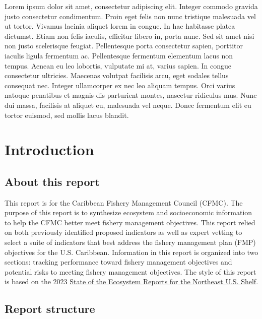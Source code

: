 \documentclass[
  letterpaper,
  oneside,
  open=any]{scrbook}
\begin{document}
Lorem ipsum dolor sit amet, consectetur adipiscing elit. Integer commodo
gravida justo consectetur condimentum. Proin eget felis non nunc
tristique malesuada vel ut tortor. Vivamus lacinia aliquet lorem in
congue. In hac habitasse platea dictumst. Etiam non felis iaculis,
efficitur libero in, porta nunc. Sed sit amet nisi non justo scelerisque
feugiat. Pellentesque porta consectetur sapien, porttitor iaculis ligula
fermentum ac. Pellentesque fermentum elementum lacus non tempus. Aenean
eu leo lobortis, vulputate mi at, varius sapien. In congue consectetur
ultricies. Maecenas volutpat facilisis arcu, eget sodales tellus
consequat nec. Integer ullamcorper ex nec leo aliquam tempus. Orci
varius natoque penatibus et magnis dis parturient montes, nascetur
ridiculus mus. Nunc dui massa, facilisis at aliquet eu, malesuada vel
neque. Donec fermentum elit eu tortor euismod, sed mollis lacus blandit.


\chapter{Introduction}\label{introduction}

\section{About this report}\label{about-this-report}

This report is for the Caribbean Fishery Management Council (CFMC). The
purpose of this report is to synthesize ecosystem and socioeconomic
information to help the CFMC better meet fishery management objectives.
This report relied on both previously identified proposed indicators as
well as expert vetting to select a suite of indicators that best address
the fishery management plan (FMP) objectives for the U.S. Caribbean.
Information in this report is organized into two sections: tracking
performance toward fishery management objectives and potential risks to
meeting fishery management objectives. The style of this report is based
on the 2023
\href{https://www.fisheries.noaa.gov/new-england-mid-atlantic/ecosystems/state-ecosystem-reports-northeast-us-shelf}{State
of the Ecosystem Reports for the Northeast U.S. Shelf}.

\section{Report structure}\label{report-structure}
\end{document}
